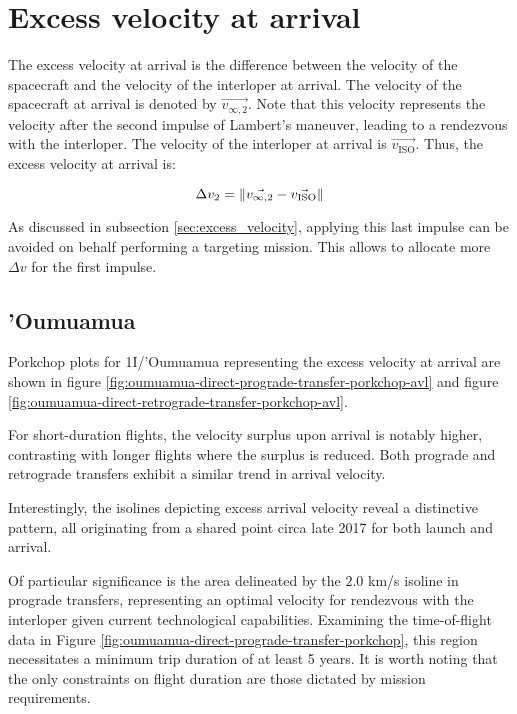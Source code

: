 \section{Excess velocity at arrival}

The excess velocity at arrival is the difference between the velocity of the
spacecraft and the velocity of the interloper at arrival. The
velocity of the spacecraft at arrival is denoted by $\vec{v_{\infty ,2}}$. Note
that this velocity represents the velocity after the second impulse of Lambert's
maneuver, leading to a rendezvous with the interloper. The velocity of the
interloper at arrival is $\vec{v_\text{ISO}}$. Thus, the excess velocity at
arrival is:

\begin{equation}
    \Delta v_2 = \lVert\vec{v_{\infty ,2}} - \vec{v_\text{ISO}}\rVert
\end{equation}

As discussed in subsection \ref{sec:excess_velocity}, applying this last impulse
can be avoided on behalf performing a targeting mission. This allows to allocate
more $\Delta v$ for the first impulse.

\subsection{'Oumuamua}

Porkchop plots for 1I/'Oumuamua representing the excess velocity at arrival are
shown in figure \ref{fig:oumuamua-direct-prograde-transfer-porkchop-avl} and figure
\ref{fig:oumuamua-direct-retrograde-transfer-porkchop-avl}.

For short-duration flights, the velocity surplus upon arrival is notably higher,
contrasting with longer flights where the surplus is reduced. Both prograde and
retrograde transfers exhibit a similar trend in arrival velocity.

Interestingly, the isolines depicting excess arrival velocity reveal a
distinctive pattern, all originating from a shared point circa late 2017 for
both launch and arrival.

Of particular significance is the area delineated by the $2.0$ km/s isoline in
prograde transfers, representing an optimal velocity for rendezvous with the
interloper given current technological capabilities. Examining the
time-of-flight data in Figure
\ref{fig:oumuamua-direct-prograde-transfer-porkchop}, this region necessitates a
minimum trip duration of at least 5 years. It is worth noting that the only
constraints on flight duration are those dictated by mission requirements.

